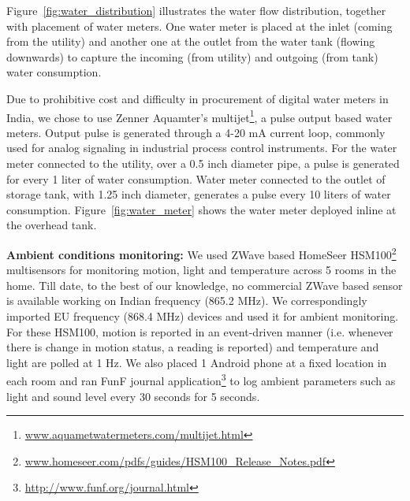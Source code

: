 \documentclass[10pt]{sensys-proc}
\newcommand{\figref}[1]{Figure~\ref{#1}}
\begin{document}
\figref{fig:water_distribution} illustrates the water flow distribution, together with placement of water meters. One water meter is placed at the inlet (coming from the utility) and another one at the outlet from the water tank (flowing downwards) to capture the incoming (from utility) and outgoing (from tank) water consumption. 

Due to prohibitive cost and difficulty in procurement of digital water meters in India, we chose to use Zenner Aquamter's multijet\footnote{\url{www.aquametwatermeters.com/multijet.html}}, a pulse output based water meters. Output pulse is generated through a 4-20 mA current loop, commonly used for analog signaling in industrial process control instruments. For the water meter connected to the utility, over a 0.5 inch diameter pipe, a pulse is generated for every 1 liter of water consumption. Water meter connected to the outlet of storage tank, with 1.25 inch diameter, generates a pulse every 10 liters of water consumption. %
\figref{fig:water_meter} shows the water meter deployed inline at the overhead tank.

\noindent \textbf{Ambient conditions monitoring:} We used ZWave based HomeSeer HSM100\footnote{\url{www.homeseer.com/pdfs/guides/HSM100_Release_Notes.pdf}} multisensors for monitoring motion, light and temperature across 5 rooms in the home. Till date, to the best of our knowledge, no commercial ZWave based sensor is available working on Indian frequency (865.2 MHz). We correspondingly imported EU frequency (868.4 MHz) devices and used it for ambient monitoring. For these HSM100, motion is reported in an event-driven manner (i.e. whenever there is change in motion status, a reading is reported) and temperature and light are polled at 1 Hz. We also placed 1 Android phone at a fixed location in each room and ran FunF journal application\footnote{\url{http://www.funf.org/journal.html}} to log ambient parameters such as light and sound level every 30 seconds for 5 seconds.
\end{document}
